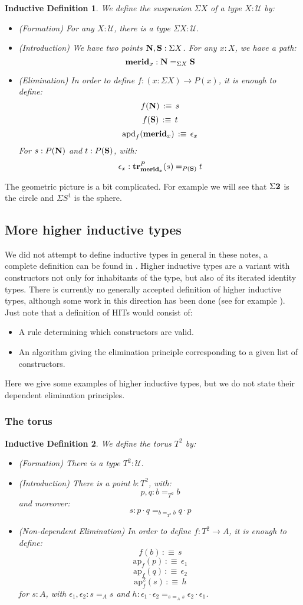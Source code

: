 \documentclass{article}
\newcommand{\sse}[1]{\medbreak \subsection{#1}}
\newcommand{\ssse}[1]{\subsubsection*{#1}}
\newcommand{\U}{{\mathcal U}}
\renewcommand{\r}{\rightarrow}
\newcommand{\ap}{\mathrm{ap}}
\newcommand{\apd}{\mathrm{apd}}
\newcommand{\tr}{\mathrm{\bf tr}}
\newcommand{\N}{\mathrm{\bf N}}
\renewcommand{\S}{\mathrm{\bf S}}
\newcommand{\merid}{\mathrm{\bf merid}}
\newcommand{\two}{{\bf 2}}
\newtheorem{ind_def}{Inductive Definition}
\begin{document}
\begin{ind_def}
We define the suspension $\Sigma X$ of a type $X:\U$ by:
\begin{itemize}
\item (Formation) For any $X:\U$, there is a type $\Sigma X : \U$.
\item (Introduction) We have two points $\N,\S : \Sigma X$. For any $x:X$, we have a path:
\[\merid_x : \N=_{\Sigma X}\S\]
\item (Elimination) In order to define $f:(x:\Sigma X)\r P(x)$, it is enough to define:
\[f(\N) \, :\equiv\, s\]
\[f(\S)\, :\equiv\, t\]
\[\apd_f(\merid_x) \, :\equiv\, \epsilon_x\]
For $s:P(\N)$ and $t:P(\S)$, with:
\[\epsilon_x : \tr^P_{\merid_x}(s) =_{P(\S)} t\] 
\end{itemize}
\end{ind_def}

The geometric picture is a bit complicated. For example we will see that $\Sigma \two$ is the circle and $\Sigma S^1$ is the sphere.



\sse{More higher inductive types}

We did not attempt to define inductive types in general in these notes, a complete definition can be found in \cite{dybjer1994inductive}. Higher inductive types are a variant with constructors not only for inhabitants of the type, but also of its iterated identity types. There is currently no generally accepted definition of higher inductive types, although some work in this direction has been done (see for example \cite{cavallo2019higher}). Just note that a definition of HITs would consist of:
\begin{itemize}
\item A rule determining which constructors are valid.
\item An algorithm giving the elimination principle corresponding to a given list of constructors.
\end{itemize}
Here we give some examples of higher inductive types, but we do not state their dependent elimination principles.


\ssse{The torus}

\begin{ind_def}
We define the torus $T^2$ by:
\begin{itemize}
\item (Formation) There is a type $T^2:\U$.
\item (Introduction) There is a point $b:T^2$, with:
\[p,q:b=_{T^2}b\] 
and moreover: 
\[s:p\cdot q =_{b=_{T^2}b} q\cdot p\]
\item (Non-dependent Elimination) In order to define $f:T^2\r A$, it is enough to define:
\[f(b) \, :\equiv\, s\]
\[\ap_f(p) \, :\equiv\, \epsilon_1 \]
\[\ap_f(q) \, :\equiv\, \epsilon_2\]
\[\ap^2_f(s) \, :\equiv\, h\]
for $s:A$, with $\epsilon_1,\epsilon_2 : s=_As$ and $h:\epsilon_1\cdot\epsilon_2 =_{s=_As}\epsilon_2\cdot\epsilon_1$.
\end{itemize}
\end{ind_def}
\end{document}
